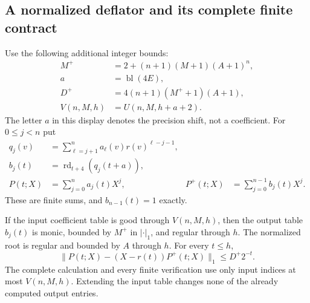 \subsection{A normalized deflator and its complete finite contract}

Use the following additional integer bounds:
\begin{align*}
 M^+&=2+(n+1)(M+1)(A+1)^n,\\
 a&=\operatorname{bl}(4E),\\
 D^+&=4(n+1)(M^++1)(A+1),\\
 V(n,M,h)&=U(n,M,h+a+2).
 \tag{F10}\label{eq:fta-deflation-budgets}
\end{align*}
The letter $a$ in this display denotes the precision shift, not a
coefficient.  For $0\le j<n$ put
\begin{align*}
 q_j(v)&=\sum_{\ell=j+1}^n a_\ell(v)r(v)^{\ell-j-1},\\
 b_j(t)&=\operatorname{rd}_{t+4}(q_j(t+a)),\\
 P(t;X)&=\sum_{j=0}^n a_j(t)X^j,
 &P^+(t;X)&=\sum_{j=0}^{n-1} b_j(t)X^j.
 \tag{F11}\label{eq:fta-deflator}
\end{align*}
These are finite sums, and $b_{n-1}(t)=1$ exactly.

\begin{lemma}\label{lem:fta-deflation-table}
If the input coefficient table is good through $V(n,M,h)$, then the
output table $b_j(t)$ is monic, bounded by $M^+$ in $|\cdot|_1$, and
regular through $h$.  The normalized root is regular and bounded by $A$
through $h$.  For every $t\le h$,
\[
 \|P(t;X)-(X-r(t))P^+(t;X)\|_1\le D^+2^{-t}.
 \tag{F12}\label{eq:fta-defect}
\]
The complete calculation and every finite verification use only input
indices at most $V(n,M,h)$.  Extending the input table changes none of the
already computed output entries.
\end{lemma}

